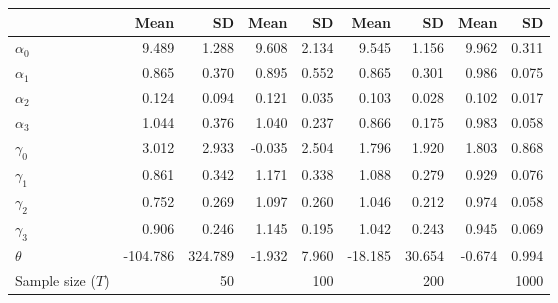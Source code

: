 
\begin{tabular}[t]{lrrrrrrrr}
\toprule
  & Mean & SD & Mean  & SD  & Mean   & SD   & Mean    & SD   \\
\midrule
$\alpha_{0}$ & 9.489 & 1.288 & 9.608 & 2.134 & 9.545 & 1.156 & 9.962 & 0.311\\
$\alpha_{1}$ & 0.865 & 0.370 & 0.895 & 0.552 & 0.865 & 0.301 & 0.986 & 0.075\\
$\alpha_{2}$ & 0.124 & 0.094 & 0.121 & 0.035 & 0.103 & 0.028 & 0.102 & 0.017\\
$\alpha_{3}$ & 1.044 & 0.376 & 1.040 & 0.237 & 0.866 & 0.175 & 0.983 & 0.058\\
$\gamma_{0}$ & 3.012 & 2.933 & -0.035 & 2.504 & 1.796 & 1.920 & 1.803 & 0.868\\
$\gamma_{1}$ & 0.861 & 0.342 & 1.171 & 0.338 & 1.088 & 0.279 & 0.929 & 0.076\\
$\gamma_{2}$ & 0.752 & 0.269 & 1.097 & 0.260 & 1.046 & 0.212 & 0.974 & 0.058\\
$\gamma_{3}$ & 0.906 & 0.246 & 1.145 & 0.195 & 1.042 & 0.243 & 0.945 & 0.069\\
$\theta$ & -104.786 & 324.789 & -1.932 & 7.960 & -18.185 & 30.654 & -0.674 & 0.994\\
Sample size ($T$) &  & 50 &  & 100 &  & 200 &  & 1000\\
\bottomrule
\end{tabular}
